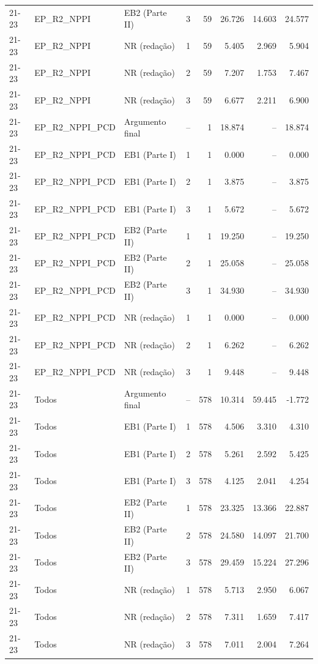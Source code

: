 \begin{longtable}{lllcrrrr}
21-23 & EP\_R2\_NPPI & EB2 (Parte II) & 3 & 59 & 26.726 & 14.603 & 24.577 \\
21-23 & EP\_R2\_NPPI & NR (redação) & 1 & 59 & 5.405 & 2.969 & 5.904 \\
21-23 & EP\_R2\_NPPI & NR (redação) & 2 & 59 & 7.207 & 1.753 & 7.467 \\
21-23 & EP\_R2\_NPPI & NR (redação) & 3 & 59 & 6.677 & 2.211 & 6.900 \\
21-23 & EP\_R2\_NPPI\_PCD & Argumento final & -- & 1 & 18.874 & -- & 18.874 \\
21-23 & EP\_R2\_NPPI\_PCD & EB1 (Parte I) & 1 & 1 & 0.000 & -- & 0.000 \\
21-23 & EP\_R2\_NPPI\_PCD & EB1 (Parte I) & 2 & 1 & 3.875 & -- & 3.875 \\
21-23 & EP\_R2\_NPPI\_PCD & EB1 (Parte I) & 3 & 1 & 5.672 & -- & 5.672 \\
21-23 & EP\_R2\_NPPI\_PCD & EB2 (Parte II) & 1 & 1 & 19.250 & -- & 19.250 \\
21-23 & EP\_R2\_NPPI\_PCD & EB2 (Parte II) & 2 & 1 & 25.058 & -- & 25.058 \\
21-23 & EP\_R2\_NPPI\_PCD & EB2 (Parte II) & 3 & 1 & 34.930 & -- & 34.930 \\
21-23 & EP\_R2\_NPPI\_PCD & NR (redação) & 1 & 1 & 0.000 & -- & 0.000 \\
21-23 & EP\_R2\_NPPI\_PCD & NR (redação) & 2 & 1 & 6.262 & -- & 6.262 \\
21-23 & EP\_R2\_NPPI\_PCD & NR (redação) & 3 & 1 & 9.448 & -- & 9.448 \\
21-23 & Todos & Argumento final & -- & 578 & 10.314 & 59.445 & -1.772 \\
21-23 & Todos & EB1 (Parte I) & 1 & 578 & 4.506 & 3.310 & 4.310 \\
21-23 & Todos & EB1 (Parte I) & 2 & 578 & 5.261 & 2.592 & 5.425 \\
21-23 & Todos & EB1 (Parte I) & 3 & 578 & 4.125 & 2.041 & 4.254 \\
21-23 & Todos & EB2 (Parte II) & 1 & 578 & 23.325 & 13.366 & 22.887 \\
21-23 & Todos & EB2 (Parte II) & 2 & 578 & 24.580 & 14.097 & 21.700 \\
21-23 & Todos & EB2 (Parte II) & 3 & 578 & 29.459 & 15.224 & 27.296 \\
21-23 & Todos & NR (redação) & 1 & 578 & 5.713 & 2.950 & 6.067 \\
21-23 & Todos & NR (redação) & 2 & 578 & 7.311 & 1.659 & 7.417 \\
21-23 & Todos & NR (redação) & 3 & 578 & 7.011 & 2.004 & 7.264 \\

\end{longtable}
